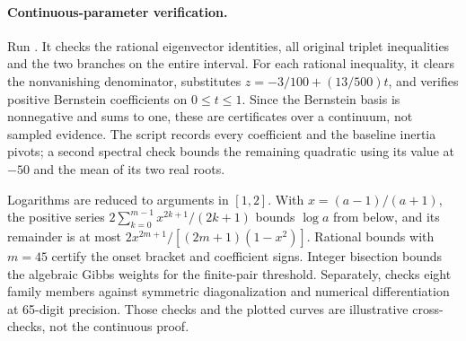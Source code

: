 \paragraph{Continuous-parameter verification.}
Run . It checks the rational eigenvector identities, all original triplet inequalities and the two branches on the entire interval. For each rational inequality, it clears the nonvanishing denominator, substitutes $z=-3/100+(13/500)t$, and verifies positive Bernstein coefficients on $0\leq t\leq1$. Since the Bernstein basis is nonnegative and sums to one, these are certificates over a continuum, not sampled evidence. The script records every coefficient and the baseline inertia pivots; a second spectral check bounds the remaining quadratic using its value at $-50$ and the mean of its two real roots.

Logarithms are reduced to arguments in $[1,2]$. With $x=(a-1)/(a+1)$, the positive series $2\sum_{k=0}^{m-1}x^{2k+1}/(2k+1)$ bounds $\log a$ from below, and its remainder is at most $2x^{2m+1}/[(2m+1)(1-x^2)]$. Rational bounds with $m=45$ certify the onset bracket and coefficient signs. Integer bisection bounds the algebraic Gibbs weights for the finite-pair threshold. Separately,  checks eight family members against symmetric diagonalization and numerical differentiation at 65-digit precision. Those checks and the plotted curves are illustrative cross-checks, not the continuous proof.

